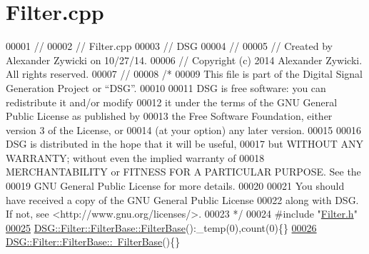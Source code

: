 \hypertarget{_filter_8cpp_source}{\section{Filter.\+cpp}
\label{_filter_8cpp_source}
}

\begin{DoxyCode}
00001 \textcolor{comment}{//}
00002 \textcolor{comment}{//  Filter.cpp}
00003 \textcolor{comment}{//  DSG}
00004 \textcolor{comment}{//}
00005 \textcolor{comment}{//  Created by Alexander Zywicki on 10/27/14.}
00006 \textcolor{comment}{//  Copyright (c) 2014 Alexander Zywicki. All rights reserved.}
00007 \textcolor{comment}{//}
00008 \textcolor{comment}{/*}
00009 \textcolor{comment}{ This file is part of the Digital Signal Generation Project or “DSG”.}
00010 \textcolor{comment}{}
00011 \textcolor{comment}{ DSG is free software: you can redistribute it and/or modify}
00012 \textcolor{comment}{ it under the terms of the GNU General Public License as published by}
00013 \textcolor{comment}{ the Free Software Foundation, either version 3 of the License, or}
00014 \textcolor{comment}{ (at your option) any later version.}
00015 \textcolor{comment}{}
00016 \textcolor{comment}{ DSG is distributed in the hope that it will be useful,}
00017 \textcolor{comment}{ but WITHOUT ANY WARRANTY; without even the implied warranty of}
00018 \textcolor{comment}{ MERCHANTABILITY or FITNESS FOR A PARTICULAR PURPOSE.  See the}
00019 \textcolor{comment}{ GNU General Public License for more details.}
00020 \textcolor{comment}{}
00021 \textcolor{comment}{ You should have received a copy of the GNU General Public License}
00022 \textcolor{comment}{ along with DSG.  If not, see <http://www.gnu.org/licenses/>.}
00023 \textcolor{comment}{ */}
00024 \textcolor{preprocessor}{#include "\hyperlink{_filter_8h}{Filter.h}"}
\hypertarget{_filter_8cpp_source_l00025}{}\hyperlink{class_d_s_g_1_1_filter_1_1_filter_base_accc0a6729e252abaa24ad7f72b2f351d}{00025} \hyperlink{class_d_s_g_1_1_filter_1_1_filter_base_accc0a6729e252abaa24ad7f72b2f351d}{DSG::Filter::FilterBase::FilterBase}():\_temp(0),count(0)\{\}
\hypertarget{_filter_8cpp_source_l00026}{}\hyperlink{class_d_s_g_1_1_filter_1_1_filter_base_a1e220c7fe383eba4822f3896d8b2c2b2}{00026} \hyperlink{class_d_s_g_1_1_filter_1_1_filter_base_a1e220c7fe383eba4822f3896d8b2c2b2}{DSG::Filter::FilterBase::~FilterBase}()\{\}
\end{DoxyCode}
